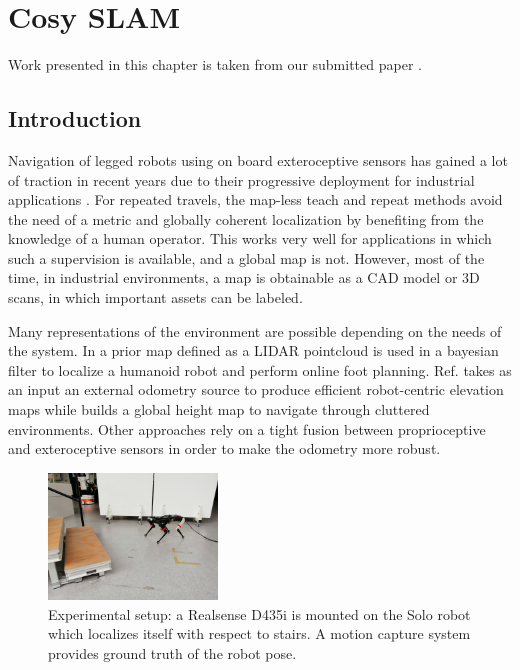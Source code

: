 \chapter{Cosy SLAM}
\minitoc
\label{chp:cosyslam}

Work presented in this chapter is taken from our submitted paper \cite{debeunne2021cosyslam}.

\section{Introduction}
Navigation of legged robots using on board exteroceptive sensors has gained a lot of traction in recent years due to their progressive deployment for 
industrial applications \cite{bellicoso2018advances}. 
For repeated travels, the map-less teach and repeat methods \cite{furgale2010visual, mattamala2021learning} avoid the need of a metric and globally coherent localization 
by benefiting from the knowledge of a human operator. This works very well for applications in which such a supervision is available, and a global map is not. 
However, most of the time, in industrial environments, a map is obtainable as a CAD model or 3D scans, in which important assets can be labeled.

Many representations of the environment are possible depending on the needs of the system. In \cite{fallon2014drift} a prior map defined as a LIDAR pointcloud is 
used in a bayesian filter to localize a humanoid robot and perform online foot planning. Ref. \cite{Fankhauser2018ProbabilisticTerrainMapping} takes as an input 
an external odometry source to produce efficient robot-centric elevation maps while \cite{ kim2020vision} builds a global height map to navigate through cluttered 
environments. Other approaches \cite{wisth2021vilens} rely on a tight fusion between proprioceptive and exteroceptive sensors in order to make the odometry more robust. 

\begin{figure}%
  \centering
  \includegraphics[width=0.40\textwidth]{figures/cosyslam/solo_closer_small.png}
  \caption{Experimental setup: a Realsense D435i is mounted on the Solo robot which localizes itself with respect to stairs. A motion capture system provides ground 
            truth of the robot pose.}
  \label{fig:solo_and_stairs}
\end{figure}

